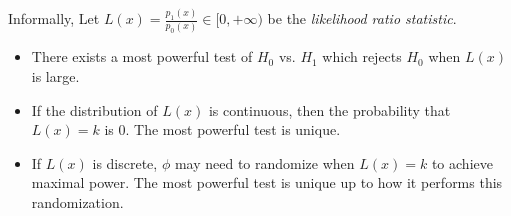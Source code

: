 \documentclass[a4paper]{article}
\begin{document}
\begin{remark}
	Informally, Let $L(x) = \frac{p_1(x)}{p_0(x)} \in [0,+\infty)$ be the \emph{likelihood ratio statistic}.
	\begin{itemize}
		\item There exists a most powerful test of $H_0$ vs. $H_1$ which rejects $H_0$ when $L(x)$ is large.
		\item If the distribution of $L(x)$ is continuous, then the probability that $L(x) = k$ is $0$. The most powerful test is unique.
		\item If $L(x)$ is discrete, $\phi$ may need to randomize when $L(x) = k$ to achieve maximal power. The most powerful test is unique up to how it performs this randomization.
	\end{itemize}
\end{remark}
\end{document}
